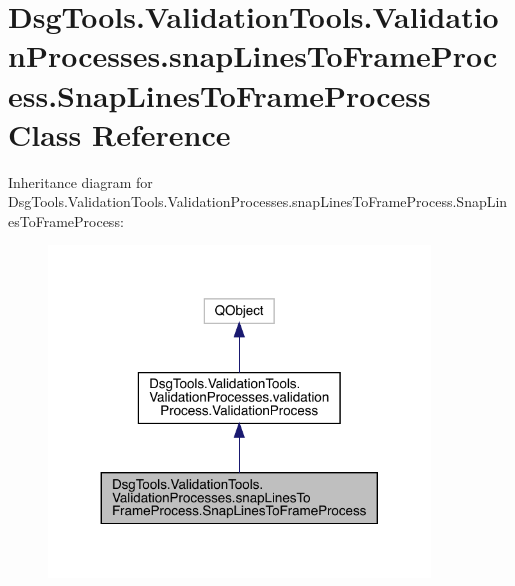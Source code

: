 \hypertarget{class_dsg_tools_1_1_validation_tools_1_1_validation_processes_1_1snap_lines_to_frame_process_1_1_snap_lines_to_frame_process}{}\section{Dsg\+Tools.\+Validation\+Tools.\+Validation\+Processes.\+snap\+Lines\+To\+Frame\+Process.\+Snap\+Lines\+To\+Frame\+Process Class Reference}
\label{class_dsg_tools_1_1_validation_tools_1_1_validation_processes_1_1snap_lines_to_frame_process_1_1_snap_lines_to_frame_process}


Inheritance diagram for Dsg\+Tools.\+Validation\+Tools.\+Validation\+Processes.\+snap\+Lines\+To\+Frame\+Process.\+Snap\+Lines\+To\+Frame\+Process\+:
\nopagebreak
\begin{figure}[H]
\begin{center}
\leavevmode
\includegraphics[width=287pt]{class_dsg_tools_1_1_validation_tools_1_1_validation_processes_1_1snap_lines_to_frame_process_1_1299185d6834b814a63c37a27569aa648}
\end{center}
\end{figure}


